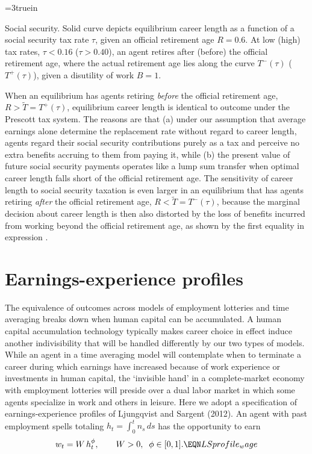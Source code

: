 \centerline{\epsfxsize=3truein}
\caption{Social security. Solid curve depicts equilibrium career
length as a function of a social security tax rate $\tau$,
given an official retirement age $R=0.6$. At low (high)
tax rates, $\tau <0.16$ ($\tau > 0.40$), an agent retires after
(before) the official retirement age, where the actual retirement
age lies along the curve $T^-(\tau)$ ($T^+(\tau)$), given a
disutility of work $B=1$.}
\endfigure

When an equilibrium has agents retiring {\it before} the official
retirement age, $R > \tilde T = T^{+}\!(\tau)$, equilibrium career
length  is identical to outcome 
under the Prescott tax system. The reasons are that (a) under
our assumption that average earnings alone determine the replacement
rate without regard to career length,  agents regard their social
security contributions purely as a tax and perceive no extra benefits
accruing to them from paying it, while (b) the present value of future
social security payments operates like a lump sum transfer when optimal
career length falls short of the official retirement age. The
sensitivity of career length to social security taxation is even
larger in an equilibrium that has agents retiring {\it after}
the official retirement age, $R < \tilde T = T^{-}\!(\tau)$,
because the marginal decision about career length is then also
distorted by the loss of benefits incurred from working beyond the
official retirement age, as shown by the first equality in
expression .



\section{Earnings-experience profiles}\label{sec:LSprofile}%
The equivalence of outcomes across models of employment lotteries and time
averaging breaks down when  human
capital can be accumulated. A human capital accumulation technology typically makes career choice  in effect
induce another indivisibility that will be handled differently by our two types of models. %
While an agent in a time
averaging model will contemplate  when to terminate a career during which
earnings have increased because of work experience or investments
in human capital, the `invisible hand' in a complete-market
economy with employment lotteries will preside over a dual labor
market in which some agents specialize in work and others in
leisure.
 Here
we adopt  a specification of  earnings-experience profiles  of
Ljungqvist and Sargent (2012). An agent with past employment
spells totaling $h_t = \int_0^t n_s \,ds$ has the opportunity
to earn
$$
w_t = W\, h_t^\phi, \quad \quad W>0, \;\; \phi\in[0,1].  \EQN LSprofile_wage
$$
%



